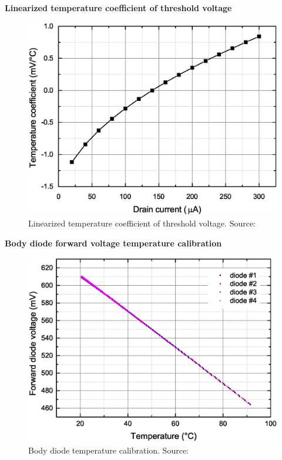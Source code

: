     \bigskip \textbf{Linearized temperature coefficient of threshold voltage}
    \begin{figure}[H]
        \centering
        \includegraphics[width=0.7\paperwidth]{img/05/mg_tc_coefficients.eps}
        \caption{Linearized temperature coefficient of threshold voltage. Source: \cite{MGThesis}}
    \end{figure}

    \bigskip \textbf{Body diode forward voltage temperature calibration}
    \begin{figure}[H]
        \centering
        \includegraphics[width=0.7\paperwidth]{img/05/mg_diode_temp.eps}
        \caption{Body diode temperature calibration. Source: \cite{MGThesis}}
    \end{figure}

